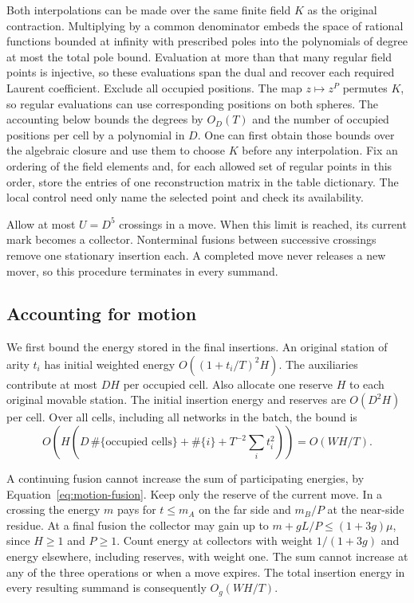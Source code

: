 Both interpolations can be made over the same finite field $K$ as the
original contraction. Multiplying by a common denominator embeds the
space of rational functions bounded at infinity with prescribed poles
into the polynomials of degree at most the total pole bound. Evaluation
at more than that many regular field points is injective, so these
evaluations span the dual and recover each required Laurent coefficient.
Exclude all occupied positions. The map $z\mapsto z^P$ permutes $K$, so
regular evaluations can use corresponding positions on both spheres.
The accounting below bounds the degrees by $O_D(T)$ and the number of
occupied positions per cell by a polynomial in $D$. One can first
obtain those bounds over the algebraic closure and use them to choose
$K$ before any interpolation. Fix an ordering of the field
elements and, for each allowed set of regular points in this order,
store the entries of one reconstruction matrix in the table dictionary. The local control need only
name the selected point and check its availability.

Allow at most $U=D^5$ crossings in a move. When this limit is reached,
its current mark becomes a collector. Nonterminal fusions between
successive crossings remove one stationary insertion each. A completed
move never releases a new mover, so this procedure terminates in every
summand.

\subsection{Accounting for motion}

We first bound the energy stored in the final insertions. An original
station of arity $t_i$ has initial weighted energy $O((1+t_i/T)^2H)$.
The auxiliaries contribute at most $DH$ per occupied cell. Also allocate
one reserve $H$ to each original movable station. The initial insertion
energy and reserves are $O(D^2H)$ per cell. Over all cells, including
all networks in the batch, the bound is
\[
 O\!\left(H\left(D\,\#\{\text{occupied cells}\}
                  +\#\{i\}+T^{-2}\sum_i t_i^2\right)\right)
       =O(WH/T).
\]

A continuing fusion cannot increase the sum of participating energies,
by Equation~\eqref{eq:motion-fusion}. Keep only the reserve of the
current move. In a crossing the energy $m$ pays for $t\le m_A$ on the
far side and $m_B/P$ at the near-side residue. At a final fusion the
collector may gain up to $m+gL/P\le(1+3g)\mu$, since $H\ge1$ and
$P\ge1$. Count energy at collectors with weight $1/(1+3g)$ and energy
elsewhere, including reserves, with weight one. The sum cannot
increase at any of the three operations or when a move expires. The
total insertion energy in every resulting summand is consequently
$O_g(WH/T)$.


